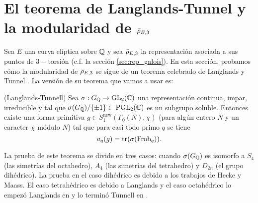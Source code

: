 \documentclass[../../tesis_maestria]{subfiles}
\begin{document}
\section{El teorema de Langlands-Tunnel y la modularidad de $\bar{\rho}_{E,3}$}\label{sec:langlands_tunnell}
Sea $E$ una curva el\'iptica sobre $\mathbb{Q}$ y sea $\bar{\rho}_{E,3}$ la representaci\'on asociada a sus puntos de $3-$torsi\'on (c.f. la secci\'on \ref{sec:rep_galois}). En esta secci\'on, probamos c\'omo la modularidad de $\bar{\rho}_{E,3}$ se sigue de un teorema celebrado de Langlands \cite{LanglandsBCFGL} y Tunnel \cite{TunnellACFROOT}. La versi\'on de su teorema que vamos a usar es:

\begin{thm}\label{thm:langlandstunnell}(Langlands-Tunnell)
  Sea $\sigma:G_{\mathbb{Q}}\rightarrow\mathrm{GL}_2(\mathbb{C})$ una representaci\'on continua, impar, irreducible y tal que $\sigma(G_{\mathbb{Q}})/\{\pm1\}\subset\mathrm{PGL}_2(\mathbb{C})$ es un subgrupo soluble. Entonces existe una forma primitiva $g\in S_1^{\mathrm{new}}(\Gamma_0(N),\chi)$ (para alg\'un entero $N$ y un caracter $\chi$ m\'odulo $N$) tal que para casi todo primo $q$ se tiene
  \[
    a_q(g)=\mathrm{tr}(\sigma(\mathrm{Frob}_q)).
  \]
\end{thm}

La prueba de este teorema se divide en tres casos: cuando $\sigma(G_{\mathbb{Q}})$ es isomorfo a $S_4$ (las simetr\'ias del octahedro), $A_4$ (las simetr\'ias del tetrahedro) y $D_{2n}$ (el grupo dih\'edrico). La prueba en el caso dih\'edrico es debido a los trabajos de Hecke y Maass. El caso tetrah\'edrico es debido a Langlands y el caso octah\'edrico lo empez\'o Langlands en \cite{LanglandsBCFGL} y lo termin\'o Tunnell en \cite{TunnellACFROOT}.

%
%
\end{document}
